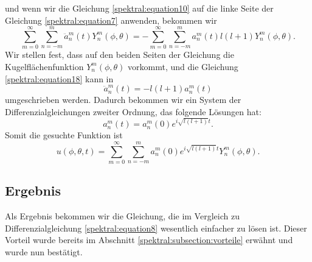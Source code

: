und wenn wir die Gleichung \eqref{spektral:equation10} auf die linke Seite der Gleichung \eqref{spektral:equation7} anwenden, bekommen wir
\begin{equation}
\sum_{m=0}^{\infty}\sum_{n=-m}^{m}\ddot{a}_n^m(t)Y_n^m(\phi, \theta) = -\sum_{m=0}^{\infty}\sum_{n=-m}^{m}a_n^m(t)l(l+1)Y_n^m(\phi, \theta).
\label{spektral:equation18}
\end{equation}
Wir stellen fest, dass auf den beiden Seiten der Gleichung die Kugelflächenfunktion $Y_n^m(\phi, \theta)$ vorkommt, und die Gleichung \eqref{spektral:equation18} kann in 
\begin{equation}
\ddot{a}_n^m(t) = -l(l+1)a_n^m(t)
\label{spektral:equation19}
\end{equation}
umgeschrieben werden.
Dadurch bekommen wir ein System der Differenzialgleichungen zweiter Ordnung, das folgende Lösungen hat:
\begin{equation}
a_n^m(t) = a_n^m(0)e^{i\sqrt{l(l+1)}t}.
\label{spektral:equation20}
\end{equation}
Somit die gesuchte Funktion ist
\begin{equation}
u(\phi, \theta, t) = \sum_{m=0}^{\infty}\sum_{n=-m}^{m}a_n^m(0)e^{i\sqrt{l(l+1)}t}Y_n^m(\phi, \theta).
\label{spektral:equation21}
\end{equation}

\subsection{Ergebnis
\label{spektral:subsection:ergebnis}}

Als Ergebnis bekommen wir die Gleichung, die im Vergleich zu Differenzialgleichung \eqref{spektral:equation8} wesentlich einfacher zu lösen ist.
Dieser Vorteil wurde bereits im Abschnitt \ref{spektral:subsection:vorteile} erwähnt und wurde nun bestätigt.
